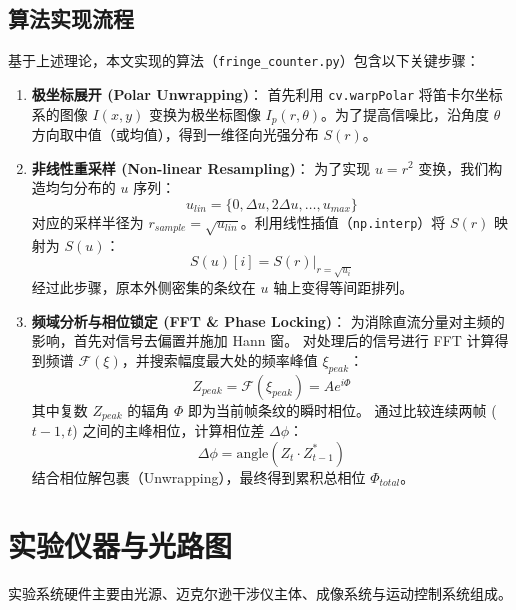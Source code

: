 \documentclass[twocolumn, a4paper, 10pt]{article}
\begin{document}
\subsection{算法实现流程}
基于上述理论，本文实现的算法（\texttt{fringe\_counter.py}）包含以下关键步骤：

\begin{enumerate}
    \item \textbf{极坐标展开 (Polar Unwrapping)}：
          首先利用 \texttt{cv.warpPolar} 将笛卡尔坐标系的图像 $I(x,y)$ 变换为极坐标图像 $I_p(r, \theta)$。为了提高信噪比，沿角度 $\theta$ 方向取中值（或均值），得到一维径向光强分布 $S(r)$。

    \item \textbf{非线性重采样 (Non-linear Resampling)}：
          为了实现 $u=r^2$ 变换，我们构造均匀分布的 $u$ 序列：
          \begin{equation}
              u_{lin} = \{0, \Delta u, 2\Delta u, \dots, u_{max}\}
          \end{equation}
          对应的采样半径为 $r_{sample} = \sqrt{u_{lin}}$。利用线性插值（\texttt{np.interp}）将 $S(r)$ 映射为 $S(u)$：
          \begin{equation}
              S(u)[i] = S(r)\Big|_{r=\sqrt{u_i}}
          \end{equation}
          经过此步骤，原本外侧密集的条纹在 $u$ 轴上变得等间距排列。

    \item \textbf{频域分析与相位锁定 (FFT \& Phase Locking)}：
          为消除直流分量对主频的影响，首先对信号去偏置并施加 Hann 窗。
          对处理后的信号进行 FFT 计算得到频谱 $\mathcal{F}(\xi)$，并搜索幅度最大处的频率峰值 $\xi_{peak}$：
          \begin{equation}
              Z_{peak} = \mathcal{F}(\xi_{peak}) = A e^{i \Phi}
          \end{equation}
          其中复数 $Z_{peak}$ 的辐角 $\Phi$ 即为当前帧条纹的瞬时相位。
          通过比较连续两帧 ($t-1, t$) 之间的主峰相位，计算相位差 $\Delta \phi$：
          \begin{equation}
              \Delta \phi = \text{angle}(Z_t \cdot Z_{t-1}^*)
          \end{equation}
          结合相位解包裹（Unwrapping），最终得到累积总相位 $\Phi_{total}$。
\end{enumerate}

\section{实验仪器与光路图}
实验系统硬件主要由光源、迈克尔逊干涉仪主体、成像系统与运动控制系统组成。
\end{document}
